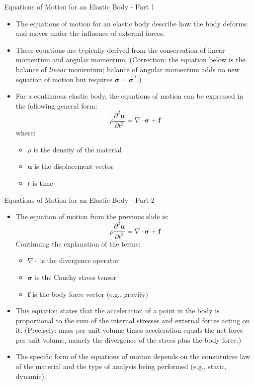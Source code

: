\documentclass{beamer}
\begin{document}
\begin{frame}{Equations of Motion for an Elastic Body - Part 1}

    \begin{itemize}
        \item The equations of motion for an elastic body describe how the body deforms and moves under the influence of external forces.
        \item These equations are typically derived from the conservation of linear momentum and angular momentum. (Correction: the equation below is the balance of \emph{linear} momentum; balance of angular momentum adds no new equation of motion but requires $\boldsymbol{\sigma} = \boldsymbol{\sigma}^T$.)
        \item For a continuous elastic body, the equations of motion can be expressed in the following general form:
        \begin{equation*}
        \rho \frac{\partial^2 \mathbf{u}}{\partial t^2} = \nabla \cdot \boldsymbol{\sigma} + \mathbf{f}
        \end{equation*}
        where:
        \begin{itemize}
            \item $\rho$ is the density of the material
            \item $\mathbf{u}$ is the displacement vector
            \item $t$ is time
        \end{itemize}
    \end{itemize}
\end{frame}

\begin{frame}{Equations of Motion for an Elastic Body - Part 2}
    \begin{itemize}
        \item The equation of motion from the previous slide is:
        \begin{equation*}
        \rho \frac{\partial^2 \mathbf{u}}{\partial t^2} = \nabla \cdot \boldsymbol{\sigma} + \mathbf{f}
        \end{equation*}
        Continuing the explanation of the terms:
        \begin{itemize}
            \item $\nabla \cdot$ is the divergence operator
            \item $\boldsymbol{\sigma}$ is the Cauchy stress tensor
            \item $\mathbf{f}$ is the body force vector (e.g., gravity)
        \end{itemize}
        \item This equation states that the acceleration of a point in the body is proportional to the sum of the internal stresses and external forces acting on it. (Precisely: mass per unit volume times acceleration equals the net force per unit volume, namely the divergence of the stress plus the body force.)
        \item The specific form of the equations of motion depends on the constitutive law of the material and the type of analysis being performed (e.g., static, dynamic).
    \end{itemize}
\end{frame}
\end{document}
